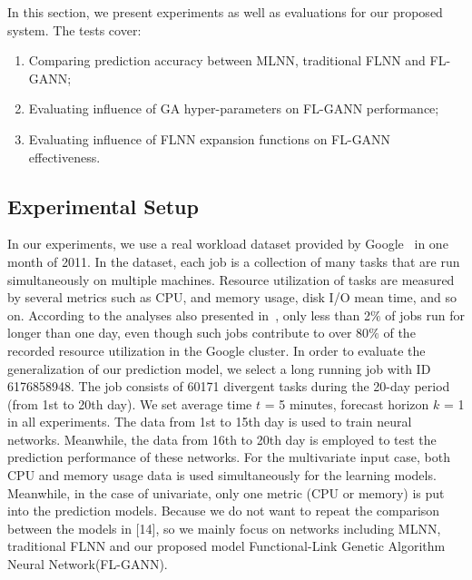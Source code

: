 \documentclass[conference]{IEEEtran}
\begin{document}
In this section, we present experiments as well as evaluations for our proposed system. The tests cover: 
\begin{enumerate}
	\item Comparing prediction accuracy between MLNN, traditional FLNN and FL-GANN;
	\item Evaluating influence of GA hyper-parameters on FL-GANN performance;
	\item Evaluating influence of FLNN expansion functions on FL-GANN effectiveness. 
\end{enumerate}

\subsection{Experimental Setup}
\label{experimental_setup}

In our experiments, we use a real workload dataset provided by Google~\cite{ref_google_trace} in one month of 2011. In the dataset, each job is a collection of many tasks that are run simultaneously on multiple machines. Resource utilization of tasks are measured by several metrics such as CPU, and memory usage, disk I/O mean time, and so on. According to the analyses also presented in~\cite{ref_google_trace}, only less than 2$\%$ of jobs run for longer than one day, even though such jobs contribute to over 80$\%$ of the recorded resource utilization in the Google cluster. In order to evaluate the generalization of our prediction model, we select a long running job with ID 6176858948. The job consists of 60171 divergent tasks during the 20-day period (from 1st to 20th day). We set average time $t$ = 5 minutes, forecast horizon $k$ = 1 in all experiments. The data from 1st to 15th day is used to train neural networks. Meanwhile, the data from 16th to 20th day is employed to test the prediction performance of these networks. For the multivariate input case, both CPU and memory usage data is used simultaneously for the learning models. Meanwhile, in the case of univariate, only one metric (CPU or memory) is put into the prediction models. Because we do not want to repeat the comparison between the models in [14], so we mainly focus on networks including MLNN, traditional FLNN and our proposed model Functional-Link Genetic Algorithm Neural Network(FL-GANN).
\end{document}
